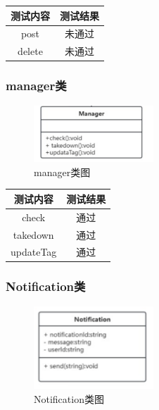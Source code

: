 \documentclass[12pt]{ctexart} %
\begin{document}
  \begin{table}[H]
  \centering  %
  \begin{tabular}{|c|c|}
    \hline
    测试内容 & 测试结果 \\
    \hline
    post& 未通过 \\
    \hline
    delete& 未通过 \\
    \hline
  \end{tabular}
\end{table}
\subsubsection{manager类}


\begin{figure}[H]
  \centering
  \includegraphics[width=0.4\textwidth]{manager.png}
  \caption{manager类图} %
\end{figure}

  \begin{table}[H]
  \centering  %
  \begin{tabular}{|c|c|}
    \hline
    测试内容 & 测试结果 \\
    \hline
    check & 通过 \\
    \hline
    takedown & 通过 \\
    \hline
    updateTag & 通过 \\
    \hline
  \end{tabular}
\end{table}

\subsubsection{Notification类}
\begin{figure}[H]
  \centering
  \includegraphics[width=0.4\textwidth]{notification.png}
  \caption{Notification类图} %
\end{figure}
\end{document}
